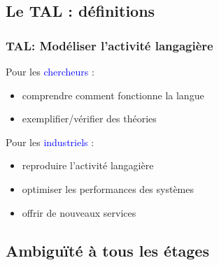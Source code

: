 

\subsection{Le TAL : définitions}

\begin{frame}
\frametitle{TAL: Modéliser l'activité langagière}

Pour les \textcolor{blue}{chercheurs} :
\begin{itemize}
   \item comprendre comment fonctionne la langue
   \item exemplifier/vérifier des théories
\end{itemize}

\medskip
Pour les \textcolor{blue}{industriels} :
\begin{itemize}
   \item reproduire l'activité langagière
   \item optimiser les performances des systèmes
   \item offrir de nouveaux services
\end{itemize}

\end{frame}

\subsection{Ambiguïté à tous les étages}
\frame{
 \tableofcontents[sectionstyle=show/shaded,subsectionstyle=show/show/hide]
}

